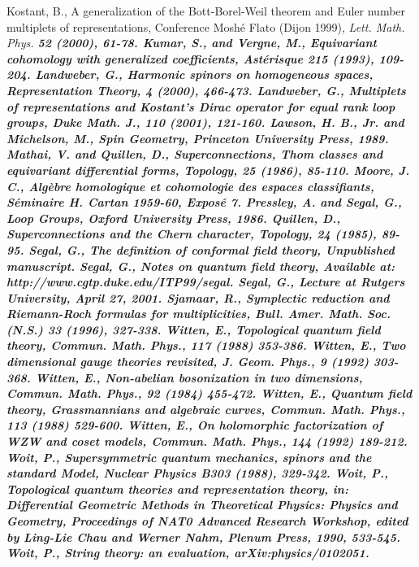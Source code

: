 \documentclass[a4paper,a4paper]{article}
\theoremstyle{conjecture}
\begin{document}
\begin{thebibliography}{99}
\rm Kostant, B.,
\rm A generalization of the Bott-Borel-Weil theorem and Euler
number multiplets of representations, Conference Mosh\'e Flato (Dijon 1999),
\it Lett. Math. Phys.
\bf 52 \rm (2000), 61-78.
\rm Kumar, S., and Vergne, M.,
\rm Equivariant cohomology with generalized coefficients,
\it Ast\'erisque \bf 215 
\rm (1993), 109-204.
\rm Landweber, G.,
\rm Harmonic spinors on homogeneous spaces,
\it Representation Theory,
\bf 4
\rm (2000), 466-473.
\rm Landweber, G.,
\rm Multiplets of representations and Kostant's Dirac operator for
equal rank loop groups,
\it Duke Math. J.,
\bf 110
\rm (2001), 121-160.
\rm Lawson, H. B., Jr. and Michelson, M.,
\it Spin Geometry,
\rm Princeton University Press, 1989.
\rm Mathai, V. and Quillen, D.,
\rm Superconnections, Thom classes and equivariant differential forms,
\it Topology,
\bf 25
\rm (1986), 85-110.
\rm Moore, J. C., \rm Alg\`ebre homologique et cohomologie des
espaces classifiants, \it S\'eminaire H. Cartan 1959-60,
Expos\'e 7. \rm
{}
\rm Pressley, A. and Segal, G.,
\it Loop Groups,
\rm Oxford University Press, 1986.
\rm Quillen, D.,
\rm Superconnections and the Chern character,
\it Topology,
\bf 24
\rm (1985), 89-95.
\rm Segal, G.,
\it The definition of conformal field theory,
\rm Unpublished manuscript.
\rm Segal, G.,
\it Notes on quantum field theory,
\rm Available at: http://www.cgtp.duke.edu/ITP99/segal.
\rm Segal, G.,
\it Lecture at Rutgers University, April 27, 2001.\rm
{}
\rm Sjamaar, R.,
\rm Symplectic reduction and Riemann-Roch formulas for multiplicities,
\it Bull. Amer. Math. Soc. (N.S.)
\bf 33
\rm (1996), 327-338.
\rm Witten, E.,
\rm Topological quantum field theory,
\it Commun. Math. Phys.,
\bf 117
\rm (1988) 353-386.
\rm Witten, E.,
\rm Two dimensional gauge theories revisited,
\it J. Geom. Phys.,
\bf 9
\rm (1992) 303-368.
\rm Witten, E.,
\rm Non-abelian bosonization in two dimensions,
\it Commun. Math. Phys.,
\bf 92
\rm (1984) 455-472.
\rm Witten, E.,
\rm Quantum field theory, Grassmannians and algebraic curves,
\it Commun. Math. Phys.,
\bf 113
\rm (1988) 529-600.
\rm Witten, E.,
\rm On holomorphic factorization of WZW and coset models,
\it Commun. Math. Phys.,
\bf 144
\rm (1992) 189-212.
\rm Woit, P.,
\rm Supersymmetric quantum mechanics, spinors and the standard Model,
\it Nuclear Physics
\bf B303
\rm (1988), 329-342.
\rm Woit, P.,
\rm Topological quantum theories and representation theory, in:
\it Differential Geometric Methods in Theoretical Physics: Physics and Geometry,
Proceedings of NAT0 Advanced Research Workshop, edited by Ling-Lie Chau and Werner Nahm,
\rm Plenum Press, 1990, 533-545.
\rm Woit, P.,
\rm String theory: an evaluation,
\rm arXiv:physics/0102051.
\end{thebibliography}
\end{document}
